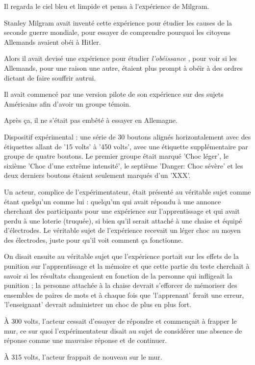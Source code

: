 Il regarda le ciel bleu et limpide et pensa à l'expérience de Milgram.

Stanley Milgram avait inventé cette expérience pour étudier les causes de la seconde guerre mondiale, pour essayer de comprendre pourquoi les citoyens Allemands avaient obéi à Hitler.

Alors il avait devisé une expérience pour étudier \emph{l'obéissance} , pour voir si les Allemands, pour une raison une autre, étaient plus prompt à obéir à des ordres dictant de faire souffrir autrui.

Il avait commencé par une version pilote de son expérience sur des sujets Américains afin d'avoir un groupe témoin.

Après ça, il ne s'était pas embêté à essayer en Allemagne.

Dispositif expérimental : une série de 30 boutons alignés horizontalement avec des étiquettes allant de '15 volts' à '450 volts', avec une étiquette supplémentaire par groupe de quatre boutons. Le premier groupe était marqué 'Choc léger', le sixième 'Choc d'une extrême intensité', le septième 'Danger: Choc sévère' et les deux derniers boutons étaient seulement marqués d'un 'XXX'.

Un acteur, complice de l'expérimentateur, était présenté au véritable sujet comme étant quelqu'un comme lui : quelqu'un qui avait répondu à une annonce cherchant des participants pour une expérience sur l'apprentissage et qui avait perdu à une loterie (truquée), si bien qu'il serait attaché à une chaise et équipé d'électrodes. Le véritable sujet de l'expérience recevait un léger choc au moyen des électrodes, juste pour qu'il voit comment ça fonctionne.

On disait ensuite au véritable sujet que l'expérience portait sur les effets de la punition sur l'apprentissage et la mémoire et que cette partie du teste cherchait à savoir si les résultats changeaient en fonction de la personne qui infligeait la punition ; la personne attachée à la chaise devrait s'efforcer de mémoriser des ensembles de paires de mots et à chaque fois que 'l'apprenant' ferait une erreur, 'l'enseignant' devrait administrer un choc de plus en plus fort.

À 300 volts, l'acteur cessait d'essayer de répondre et commençait à frapper le mur, ce sur quoi l'expérimentateur disait au sujet de considérer une absence de réponse comme une mauvaise réponse et de continuer.

À 315 volts, l'acteur frappait de nouveau sur le mur.

